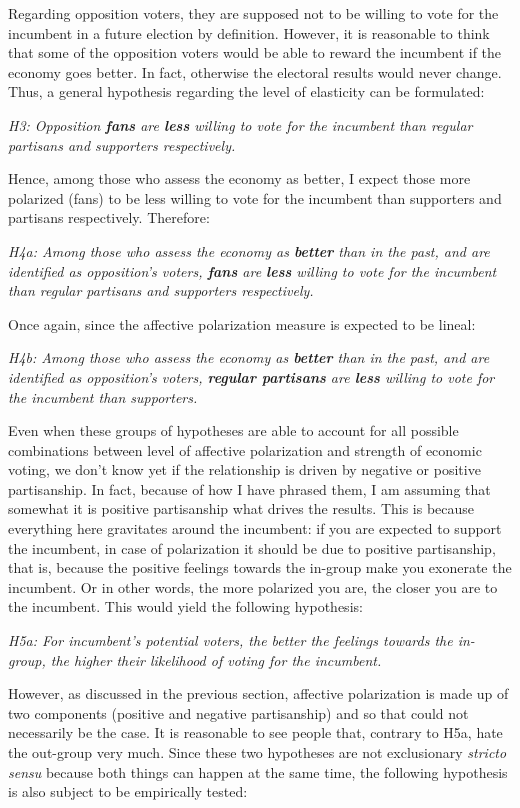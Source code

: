 \documentclass[a4paper, svgnames]{article}
\begin{document}
Regarding opposition voters, they are supposed not to be willing to vote for the incumbent in a future election by definition. However, it is reasonable to think that some of the opposition voters would be able to reward the incumbent if the economy goes better. In fact, otherwise the electoral results would never change. Thus, a general hypothesis regarding the level of elasticity can be formulated:

\textit{H3: Opposition \textbf{fans} are \textbf{less} willing to vote for the incumbent than regular partisans and supporters respectively.}

Hence, among those who assess the economy as better, I expect those more polarized (fans) to be less willing to vote for the incumbent than supporters and partisans respectively. Therefore:

\textit{H4a: Among those who assess the economy as \textbf{better} than in the past, and are identified as opposition's voters, \textbf{fans} are \textbf{less} willing to vote for the incumbent than regular partisans and supporters respectively.}

Once again, since the affective polarization measure is expected to be lineal:

\textit{H4b: Among those who assess the economy as \textbf{better} than in the past, and are identified as opposition's voters, \textbf{regular partisans} are \textbf{less} willing to vote for the incumbent than supporters.}

Even when these groups of hypotheses are able to account for all possible combinations between level of affective polarization and strength of economic voting, we don't know yet if the relationship is driven by negative or positive partisanship. In fact, because of how I have phrased them, I am assuming that somewhat it is positive partisanship what drives the results. This is because everything here gravitates around the incumbent: if you are expected to support the incumbent, in case of polarization it should be due to positive partisanship, that is, because the positive feelings towards the in-group make you exonerate the incumbent. Or in other words, the more polarized you are, the closer you are to the incumbent. This would yield the following hypothesis:

\textit{H5a: For incumbent's potential voters, the better the feelings towards the in-group, the higher their likelihood of voting for the incumbent.}

However, as discussed in the previous section, affective polarization is made up of two components (positive and negative partisanship) and so that could not necessarily be the case. It is reasonable to see people that, contrary to H5a, hate the out-group very much. Since these two hypotheses are not exclusionary \textit{stricto sensu} because both things can happen at the same time, the following hypothesis is also subject to be empirically tested:
\end{document}
